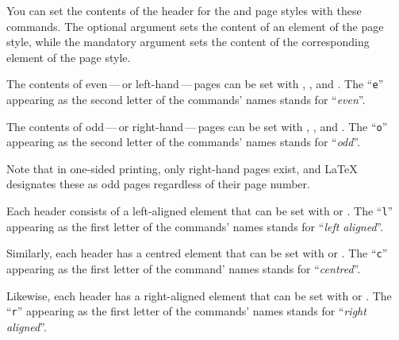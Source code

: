 \begin{Declaration}
\end{Declaration}
You can set the contents of the header for the
 and
 page styles with these commands.
The optional argument sets the content of an element of the
 page style, while the
mandatory argument sets the content of the corresponding element of the
 page style.

The contents of even\,---\,or left-hand\,---\,pages
can be set with , , and . The
``\texttt{e}'' appearing as the second letter of the commands' names stands
for ``\emph{even}''.

The contents of odd\,---\,or right-hand\,---\,pages
can be set with , , and . The
``\texttt{o}'' appearing as the second letter of the commands' names stands
for ``\emph{odd}''.

Note that in one-sided printing, only right-hand pages
exist, and \LaTeX{} designates these as odd pages regardless of their page
number.

Each header consists of a left-aligned element that can
be set with  or . The ``\texttt{l}'' appearing as
the first letter of the commands' names stands for ``\emph{left aligned}''.

Similarly, each header has a centred element that can be set
with  or . The ``\texttt{c}'' appearing as the
first letter of the command' names stands for ``\emph{centred}''.

Likewise, each header has a right-aligned element that
can be set with  or . The ``\texttt{r}'' appearing
as the first letter of the commands' names stands for ``\emph{right
aligned}''.

